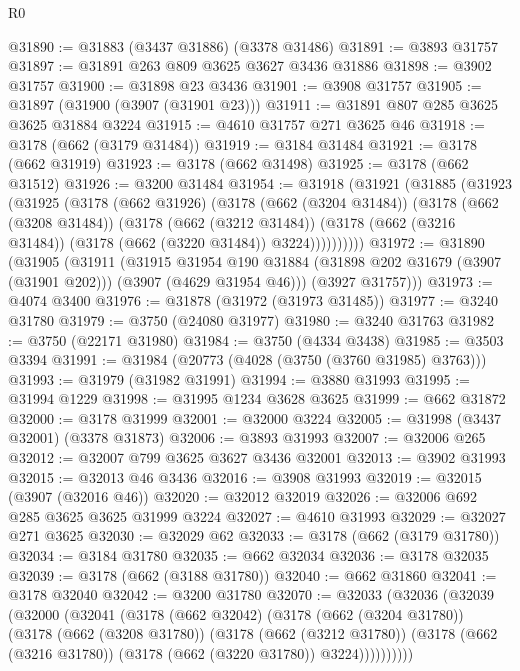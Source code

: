 \begin{lexlean}{R0}
\begin{coremodule}
@31890 := @31883 (@3437 @31886) (@3378 @31486)
@31891 := @3893 @31757
@31897 := @31891 @263 @809 @3625 @3627 @3436 @31886
@31898 := @3902 @31757
@31900 := @31898 @23 @3436
@31901 := @3908 @31757
@31905 := @31897 (@31900 (@3907 (@31901 @23)))
@31911 := @31891 @807 @285 @3625 @3625 @31884 @3224
@31915 := @4610 @31757 @271 @3625 @46
@31918 := @3178 (@662 (@3179 @31484))
@31919 := @3184 @31484
@31921 := @3178 (@662 @31919)
@31923 := @3178 (@662 @31498)
@31925 := @3178 (@662 @31512)
@31926 := @3200 @31484
@31954 := @31918
    (@31921
      (@31885
        (@31923
          (@31925
            (@3178
              (@662 @31926)
              (@3178
                (@662 (@3204 @31484))
                (@3178
                  (@662 (@3208 @31484))
                  (@3178
                    (@662 (@3212 @31484))
                    (@3178 (@662 (@3216 @31484)) (@3178 (@662 (@3220 @31484)) @3224))))))))))
@31972 := @31890
    (@31905
      (@31911
        (@31915
          @31954
          @190
          @31884
          (@31898 @202 @31679 (@3907 (@31901 @202)))
          (@3907 (@4629 @31954 @46)))
        (@3927 @31757)))
@31973 := @4074 @3400
@31976 := @31878 (@31972 (@31973 @31485))
@31977 := @3240 @31780
@31979 := @3750 (@24080 @31977)
@31980 := @3240 @31763
@31982 := @3750 (@22171 @31980)
@31984 := @3750 (@4334 @3438)
@31985 := @3503 @3394
@31991 := @31984 (@20773 (@4028 (@3750 (@3760 @31985) @3763)))
@31993 := @31979 (@31982 @31991)
@31994 := @3880 @31993
@31995 := @31994 @1229
@31998 := @31995 @1234 @3628 @3625
@31999 := @662 @31872
@32000 := @3178 @31999
@32001 := @32000 @3224
@32005 := @31998 (@3437 @32001) (@3378 @31873)
@32006 := @3893 @31993
@32007 := @32006 @265
@32012 := @32007 @799 @3625 @3627 @3436 @32001
@32013 := @3902 @31993
@32015 := @32013 @46 @3436
@32016 := @3908 @31993
@32019 := @32015 (@3907 (@32016 @46))
@32020 := @32012 @32019
@32026 := @32006 @692 @285 @3625 @3625 @31999 @3224
@32027 := @4610 @31993
@32029 := @32027 @271 @3625
@32030 := @32029 @62
@32033 := @3178 (@662 (@3179 @31780))
@32034 := @3184 @31780
@32035 := @662 @32034
@32036 := @3178 @32035
@32039 := @3178 (@662 (@3188 @31780))
@32040 := @662 @31860
@32041 := @3178 @32040
@32042 := @3200 @31780
@32070 := @32033
    (@32036
      (@32039
        (@32000
          (@32041
            (@3178
              (@662 @32042)
              (@3178
                (@662 (@3204 @31780))
                (@3178
                  (@662 (@3208 @31780))
                  (@3178
                    (@662 (@3212 @31780))
                    (@3178 (@662 (@3216 @31780)) (@3178 (@662 (@3220 @31780)) @3224))))))))))

\end{coremodule}
\end{lexlean}
